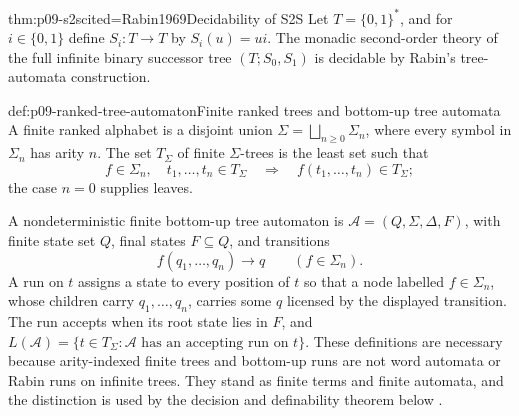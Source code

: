 \begin{hbtheorem}{thm:p09-s2s}{cited=Rabin1969}{Decidability of S2S}
Let \(T=\{0,1\}^*\), and for \(i\in\{0,1\}\) define
\(S_i:T\to T\) by \(S_i(u)=ui\).  The monadic second-order theory of the full
infinite binary successor tree \((T;S_0,S_1)\) is decidable by Rabin's
tree-automata construction.
\end{hbtheorem}

\begin{hbdefinition}{def:p09-ranked-tree-automaton}{Finite ranked trees and bottom-up tree automata}
A finite ranked alphabet is a disjoint union
\(\Sigma=\bigsqcup_{n\geq0}\Sigma_n\), where every symbol in \(\Sigma_n\) has
arity \(n\).  The set \(T_\Sigma\) of finite \(\Sigma\)-trees is the least set
such that
\[
 f\in\Sigma_n,\quad t_1,\ldots,t_n\in T_\Sigma
 \quad\Longrightarrow\quad f(t_1,\ldots,t_n)\in T_\Sigma;
\]
the case \(n=0\) supplies leaves.

A nondeterministic finite bottom-up tree automaton is
\(\mathcal A=(Q,\Sigma,\Delta,F)\), with finite state set \(Q\), final states
\(F\subseteq Q\), and transitions
\[
 f(q_1,\ldots,q_n)\longrightarrow q
 \qquad(f\in\Sigma_n).
\]
A run on \(t\) assigns a state to every position of \(t\) so that a node
labelled \(f\in\Sigma_n\), whose children carry \(q_1,\ldots,q_n\), carries
some \(q\) licensed by the displayed transition.  The run accepts when its
root state lies in \(F\), and
\(L(\mathcal A)=\{t\in T_\Sigma:\mathcal A\text{ has an accepting run on }t\}\).
These definitions are necessary because arity-indexed finite trees and
bottom-up runs are not word automata or Rabin runs on infinite trees.  They
stand as finite terms and finite automata, and the distinction is used by the
decision and definability theorem below
\cite{ComonEtAl2007}.
\end{hbdefinition}

